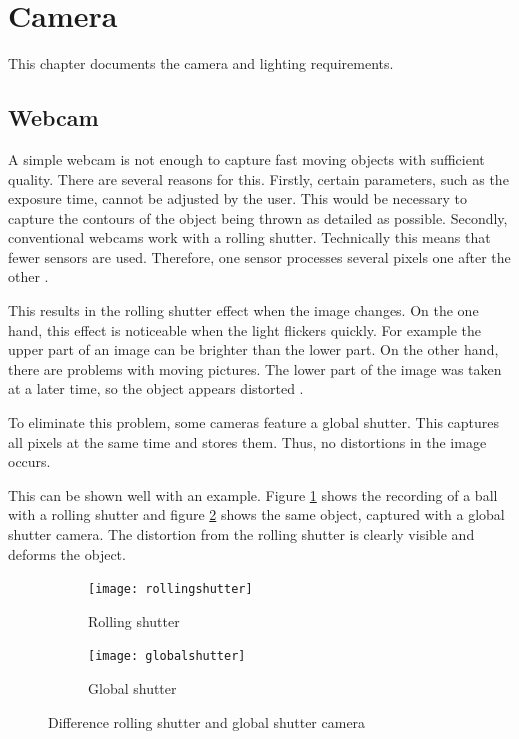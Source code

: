 \section{Camera}
\label{sec:camera}

This chapter documents the camera and lighting requirements.

\subsection{Webcam}
\label{subsec:webcam}
A simple webcam is not enough to capture fast moving objects with sufficient quality. 
There are several reasons for this.
Firstly, certain parameters, such as the exposure time, cannot be adjusted by the user.
This would be necessary to capture the contours of the object being thrown as detailed as possible.
Secondly, conventional webcams work with a rolling shutter.
Technically this means that fewer sensors are used. Therefore, one sensor processes several pixels one after the other \cite{shuttermode}.

This results in the rolling shutter effect when the image changes.
On the one hand, this effect is noticeable when the light flickers quickly.
For example the upper part of an image can be brighter than the lower part.
On the other hand, there are problems with moving pictures.
The lower part of the image was taken at a later time, so the object appears distorted \cite{global_rolling_shutter}.

To eliminate this problem, some cameras feature a global shutter. 
This captures all pixels at the same time and stores them. 
Thus, no distortions in the image occurs.

This can be shown well with an example.
Figure \ref{subfig:rollingshutter} shows the recording of a ball with a rolling shutter and figure \ref{subfig:globalshutter} shows the same object, captured with a global shutter camera.
The distortion from the rolling shutter is clearly visible and deforms the object.

\begin{figure}[ht]
	\centering
	\begin{subfigure}[b]{0.4\textwidth}
		\centering
		\texttt{[image: rollingshutter]}
		\caption{Rolling shutter}
		\label{subfig:rollingshutter}
	\end{subfigure}
	\begin{subfigure}[b]{0.4\textwidth}
		\centering
		\texttt{[image: globalshutter]}
		\caption{Global shutter}
		\label{subfig:globalshutter}
	\end{subfigure}
	\caption{Difference rolling shutter and global shutter camera \cite{shuttermode}}
	\label{fig:shuttermode}
\end{figure}

